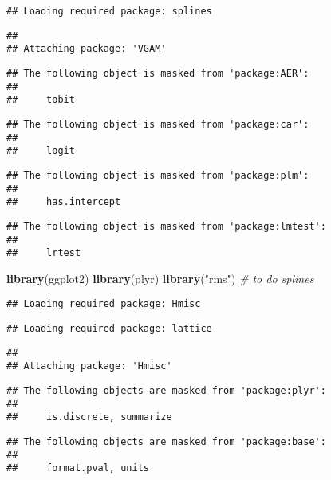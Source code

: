 \documentclass[]{article}
\newenvironment{Shaded}{\begin{snugshade}}{\end{snugshade}}
\newcommand{\CommentTok}[1]{\textcolor[rgb]{0.56,0.35,0.01}{\textit{#1}}}
\newcommand{\KeywordTok}[1]{\textcolor[rgb]{0.13,0.29,0.53}{\textbf{#1}}}
\newcommand{\NormalTok}[1]{#1}
\newcommand{\StringTok}[1]{\textcolor[rgb]{0.31,0.60,0.02}{#1}}
\begin{document}
\begin{verbatim}
## Loading required package: splines
\end{verbatim}

\begin{verbatim}
## 
## Attaching package: 'VGAM'
\end{verbatim}

\begin{verbatim}
## The following object is masked from 'package:AER':
## 
##     tobit
\end{verbatim}

\begin{verbatim}
## The following object is masked from 'package:car':
## 
##     logit
\end{verbatim}

\begin{verbatim}
## The following object is masked from 'package:plm':
## 
##     has.intercept
\end{verbatim}

\begin{verbatim}
## The following object is masked from 'package:lmtest':
## 
##     lrtest
\end{verbatim}

\begin{Shaded}
\begin{Highlighting}[]
\KeywordTok{library}\NormalTok{(ggplot2)}
\KeywordTok{library}\NormalTok{(plyr)}
\KeywordTok{library}\NormalTok{(}\StringTok{"rms"}\NormalTok{) }\CommentTok{# to do splines}
\end{Highlighting}
\end{Shaded}

\begin{verbatim}
## Loading required package: Hmisc
\end{verbatim}

\begin{verbatim}
## Loading required package: lattice
\end{verbatim}

\begin{verbatim}
## 
## Attaching package: 'Hmisc'
\end{verbatim}

\begin{verbatim}
## The following objects are masked from 'package:plyr':
## 
##     is.discrete, summarize
\end{verbatim}

\begin{verbatim}
## The following objects are masked from 'package:base':
## 
##     format.pval, units
\end{verbatim}
\end{document}
